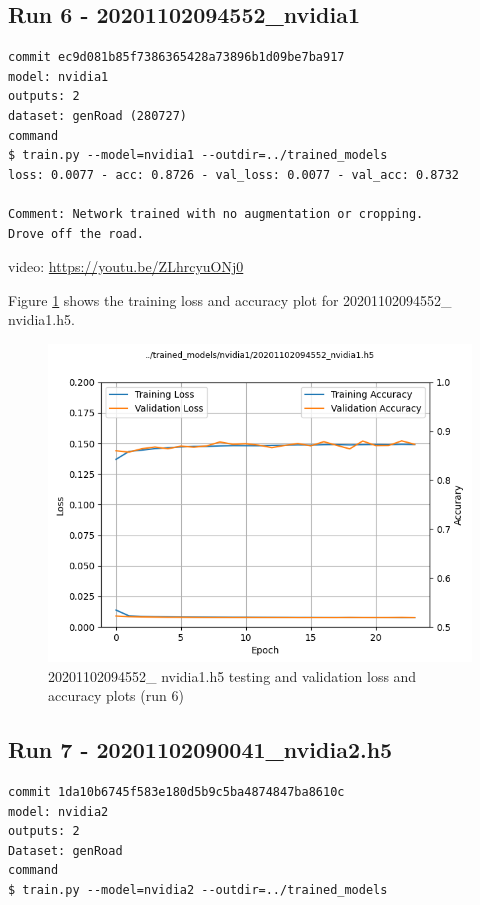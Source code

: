 \subsection{Run 6 - 20201102094552\_nvidia1}
\begin{verbatim}
commit ec9d081b85f7386365428a73896b1d09be7ba917
model: nvidia1
outputs: 2
dataset: genRoad (280727)
command
$ train.py --model=nvidia1 --outdir=../trained_models
loss: 0.0077 - acc: 0.8726 - val_loss: 0.0077 - val_acc: 0.8732

Comment: Network trained with no augmentation or cropping.
Drove off the road.

\end{verbatim}
video: \url{https://youtu.be/ZLhrcyuONj0}

Figure \ref{fig:20201102094552_nvidia1_accuracy} 
shows the training loss and accuracy plot for 20201102094552\_ nvidia1.h5.

\begin{figure}[h!]
\centering
\includegraphics[width=\textwidth]{Figures/20201102094552_nvidia1_accuracy.png}
\caption{20201102094552\_ nvidia1.h5 testing and validation loss and accuracy plots (run 6)}
\label{fig:20201102094552_nvidia1_accuracy}
\end{figure}

\subsection{Run 7 - 20201102090041\_nvidia2.h5}
\begin{verbatim}
commit 1da10b6745f583e180d5b9c5ba4874847ba8610c
model: nvidia2
outputs: 2
Dataset: genRoad
command
$ train.py --model=nvidia2 --outdir=../trained_models
\end{verbatim}

